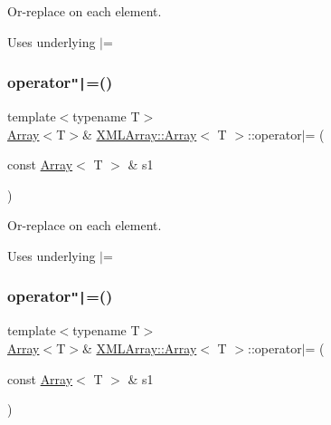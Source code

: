 Or-\/replace on each element. 

Uses underlying $\vert$= \mbox{\label{classXMLArray_1_1Array_a4a61c5f3146f39c99758bad927e08de7}} 
\subsubsection{\texorpdfstring{operator\texttt{"|}=()}{operator|=()}\hspace{0.1cm}{\footnotesize\ttfamily [2/6]}}
{\footnotesize\ttfamily template$<$typename T$>$ \\
\mbox{\hyperlink{classXMLArray_1_1Array}{Array}}$<$T$>$\& \mbox{\hyperlink{classXMLArray_1_1Array}{X\+M\+L\+Array\+::\+Array}}$<$ T $>$\+::operator$\vert$= (\begin{DoxyParamCaption}\item[{const \mbox{\hyperlink{classXMLArray_1_1Array}{Array}}$<$ T $>$ \&}]{s1 }\end{DoxyParamCaption})\hspace{0.3cm}{\ttfamily [inline]}}



Or-\/replace on each element. 

Uses underlying $\vert$= \mbox{\label{classXMLArray_1_1Array_a4a61c5f3146f39c99758bad927e08de7}} 
\subsubsection{\texorpdfstring{operator\texttt{"|}=()}{operator|=()}\hspace{0.1cm}{\footnotesize\ttfamily [3/6]}}
{\footnotesize\ttfamily template$<$typename T$>$ \\
\mbox{\hyperlink{classXMLArray_1_1Array}{Array}}$<$T$>$\& \mbox{\hyperlink{classXMLArray_1_1Array}{X\+M\+L\+Array\+::\+Array}}$<$ T $>$\+::operator$\vert$= (\begin{DoxyParamCaption}\item[{const \mbox{\hyperlink{classXMLArray_1_1Array}{Array}}$<$ T $>$ \&}]{s1 }\end{DoxyParamCaption})\hspace{0.3cm}{\ttfamily [inline]}}



